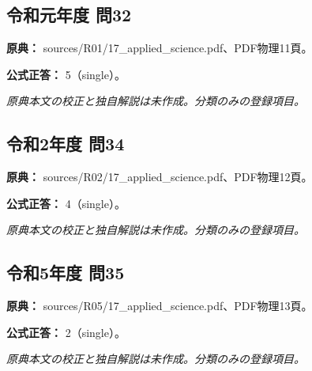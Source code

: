 \subsection{令和元年度 問32}
\label{q:r01-reg-applied-32}

\noindent\textbf{原典：} sources/R01/17\_applied\_science.pdf、PDF物理11頁。

\textbf{公式正答：} 5（single）。

\par\textit{原典本文の校正と独自解説は未作成。分類のみの登録項目。}

\subsection{令和2年度 問34}
\label{q:r02-reg-applied-34}

\noindent\textbf{原典：} sources/R02/17\_applied\_science.pdf、PDF物理12頁。

\textbf{公式正答：} 4（single）。

\par\textit{原典本文の校正と独自解説は未作成。分類のみの登録項目。}

\subsection{令和5年度 問35}
\label{q:r05-reg-applied-35}

\noindent\textbf{原典：} sources/R05/17\_applied\_science.pdf、PDF物理13頁。

\textbf{公式正答：} 2（single）。

\par\textit{原典本文の校正と独自解説は未作成。分類のみの登録項目。}
